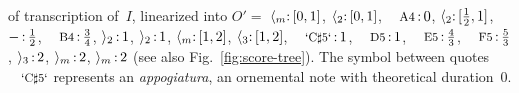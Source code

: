 \begin{example}
of transcription of~$I$,
linearized into
$O' =$
$\ccall{\mathsf{m}}\ts{[0,1]}$,
$\langle_{2}\mathop{:}{[0,1]}$,
$\mbox{\footnotesize A4}\ts{0}$,
$\langle_{2}\mathop{:}{[\frac{1}{2},1]}$,
$-\mathop{:}{\frac{1}{2}}$,
$\mbox{\footnotesize B4}\ts{\frac{3}{4}}$,
$\rangle_{2}\mathop{:}{1}$,
$\rangle_{2}\mathop{:}{1}$,
$\ccall{\mathsf{m}}\ts{[1,2]}$,
$\langle_{3}\mathop{:}{[1,2]}$,
$\mbox{\footnotesize `C$\sharp$5`}\ts{1}$,
$\mbox{\footnotesize D5}\ts{1}$,
$\mbox{\footnotesize E5}\ts{\frac{4}{3}}$,
$\mbox{\footnotesize F5}\ts{\frac{5}{3}}$,
$\rangle_{3}\mathop{:}{2}$,
$\creturn{\mathsf{m}}\ts{2}$,
$\creturn{\mathsf{m}}\ts{2}$
(see also Fig.~\ref{fig:score-tree}).
The symbol between quotes $\mbox{\footnotesize `C$\sharp$5`}$
represents an \emph{appogiatura}, %
\ie an ornemental note with theoretical duration~0.
\endex
\end{example}


